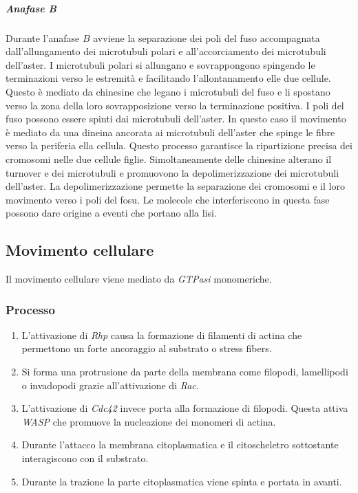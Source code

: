 				\subparagraph{Anafase \emph{B}}
				Durante l'anafase $B$ avviene la separazione dei poli del fuso accompagnata dall'allungamento dei microtubuli polari e all'accorciamento dei microtubuli dell'aster.
				I microtubuli polari si allungano e sovrappongono spingendo le terminazioni verso le estremit\`a e facilitando l'allontanamento elle due cellule.
				Questo \`e mediato da chinesine che legano i microtubuli del fuso e li spostano verso la zona della loro sovrapposizione verso la terminazione positiva.
				I poli del fuso possono essere spinti dai microtubuli dell'aster.
				In questo caso il movimento \`e mediato da una dineina ancorata ai microtubuli dell'aster che spinge le fibre verso la periferia ella cellula.
				Questo processo garantisce la ripartizione precisa dei cromosomi nelle due cellule figlie.
				Simoltaneamente delle chinesine alterano il turnover e dei microtubuli e promuovono la depolimerizzazione dei microtubuli dell'aster.
				La depolimerizzazione permette la separazione dei cromosomi e il loro movimento verso i poli del fosu.
				Le molecole che interferiscono in questa fase possono dare origine a eventi che portano alla lisi.

	\subsection{Movimento cellulare}
	Il movimento cellulare viene mediato da \emph{GTPasi} monomeriche.

		\subsubsection{Processo}
		\begin{multicols}{2}
			\begin{enumerate}
				\item L'attivazione di \emph{Rhp} causa la formazione di filamenti di actina che permettono un forte ancoraggio al substrato o stress fibers.
				\item Si forma una protrusione da parte della membrana come filopodi, lamellipodi o invadopodi grazie all'attivazione di \emph{Rac}.
				\item L'attivazione di \emph{Cdc42} invece porta alla formazione di filopodi.
					Questa attiva \emph{WASP} che promuove la nucleazione dei monomeri di actina.
				\item Durante l'attacco la membrana citoplasmatica e il citoscheletro sottostante interagiscono con il substrato.
				\item Durante la trazione la parte citoplasmatica viene spinta e portata in avanti.
			\end{enumerate}
		\end{multicols}




